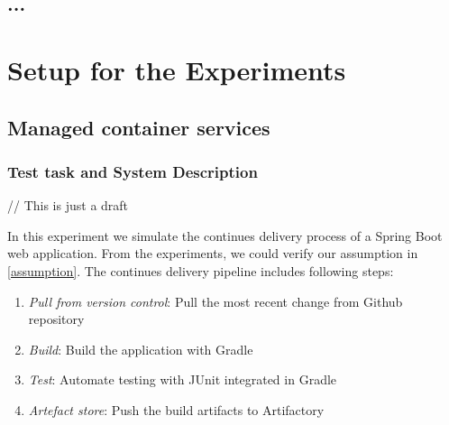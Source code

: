 \subsection{...}
\section{Setup for the Experiments}
\subsection{Managed container services}
\subsubsection{Test task and System Description}
// This is just a draft

In this experiment we simulate the continues delivery process of a Spring Boot web application. From the experiments, we could verify our assumption in \ref{assumption}.
The continues delivery pipeline includes following steps:
\begin{enumerate}
    \item \textit{Pull from version control}: Pull the most recent change from Github repository
    \item \textit{Build}: Build the application with Gradle
    \item \textit{Test}: Automate testing with JUnit integrated in Gradle
    \item \textit{Artefact store}: Push the build artifacts to Artifactory
\end{enumerate}
